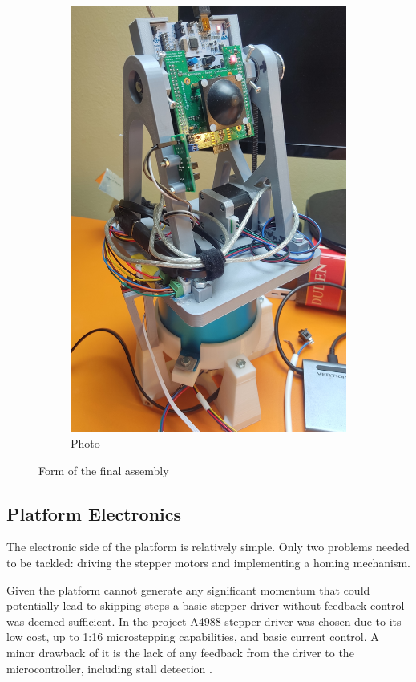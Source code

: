 \begin{figure}[h!]
\begin{subfigure}[b]{0.35\textwidth}
    \includegraphics[width=\textwidth]{../img/assembly_photo.jpg}
    \caption{Photo}
  \end{subfigure}
  \caption{Form of the final assembly}
  \label{fig:side_by_side}
\end{figure}


\subsection{Platform Electronics}

The electronic side of the platform is relatively simple.
Only two problems needed to be tackled: driving the stepper motors and implementing a homing mechanism.

Given the platform cannot generate any significant momentum that could potentially lead to skipping steps a basic stepper driver without feedback control was deemed sufficient.
In the project A4988 stepper driver was chosen due to its low cost, up to 1:16 microstepping capabilities, and basic current control.
A minor drawback of it is the lack of any feedback from the driver to the microcontroller, including stall detection \cite{a4988}.

